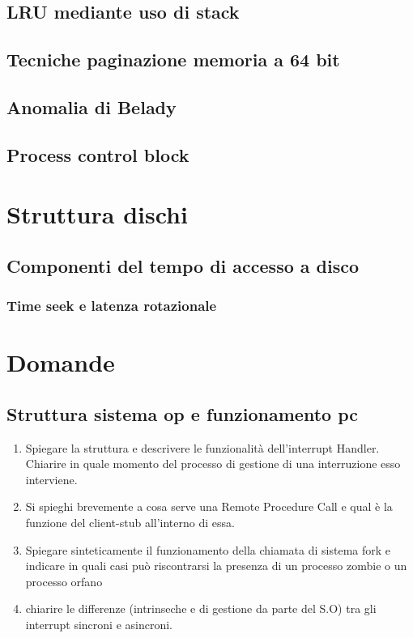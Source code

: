 \documentclass{report}
\begin{document}
\subsection{LRU mediante uso di stack}
\subsection{Tecniche paginazione memoria a 64 bit}
\subsection{Anomalia di Belady}
\subsection{Process control block}
\section{Struttura dischi}
\subsection{Componenti del tempo di accesso a disco}
\subsubsection{Time seek e latenza rotazionale}
\newpage
\section{Domande}
\subsection{Struttura sistema op e funzionamento pc}
\begin{enumerate}
    \item Spiegare la struttura e descrivere le funzionalità dell’interrupt Handler. Chiarire in quale momento
del processo di gestione di una interruzione esso interviene.
\item Si spieghi brevemente a cosa serve una Remote Procedure Call e qual è la funzione del client-stub all’interno di essa.
\item Spiegare sinteticamente il funzionamento della chiamata di sistema fork e indicare in quali casi può riscontrarsi la presenza di un processo zombie o un processo orfano
\item chiarire le differenze (intrinseche e di gestione da parte del S.O) tra gli interrupt sincroni e asincroni.
\end{enumerate}
\end{document}

